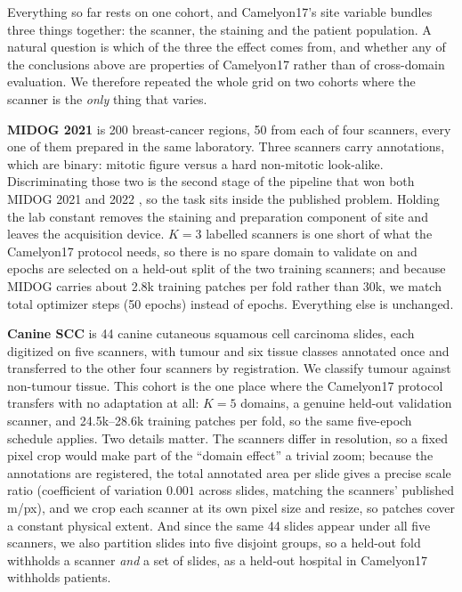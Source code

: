 \documentclass[10pt]{article} %
\begin{document}
Everything so far rests on one cohort, and Camelyon17's site variable bundles
three things together: the scanner, the staining and the patient population. A
natural question is which of the three the effect comes from, and whether any
of the conclusions above are properties of Camelyon17 rather than of
cross-domain evaluation. We therefore repeated the whole grid on two cohorts
where the scanner is the \emph{only} thing that varies.

\textbf{MIDOG 2021} \citep{aubreville2023midog} is 200 breast-cancer regions,
50 from each of four scanners, every one of them prepared in the same
laboratory. Three scanners carry annotations, which are binary: mitotic figure
versus a hard non-mitotic look-alike. Discriminating those two is the second
stage of the pipeline that won both MIDOG 2021 and 2022
\citep{jahanifar2024mitosis}, so the task sits inside the published problem.
Holding the lab constant removes the staining and preparation component of site
and leaves the acquisition device. $K=3$ labelled scanners is one short of
what the Camelyon17 protocol needs, so there is no spare domain to validate on
and epochs are selected on a held-out split of the two training scanners; and
because MIDOG carries about 2.8k training patches per fold rather than 30k, we
match total optimizer steps (50 epochs) instead of epochs. Everything else is
unchanged.

\textbf{Canine SCC} \citep{wilm2023canine} is 44 canine cutaneous squamous cell
carcinoma slides, each digitized on five scanners, with tumour and six tissue
classes annotated once and transferred to the other four scanners by
registration. We classify tumour against non-tumour tissue. This cohort is the
one place where the Camelyon17 protocol transfers with no adaptation at all:
$K=5$ domains, a genuine held-out validation scanner, and 24.5k--28.6k training
patches per fold, so the same five-epoch schedule applies. Two details matter.
The scanners differ in resolution, so a fixed pixel crop would make part of the
``domain effect'' a trivial zoom; because the annotations are registered, the
total annotated area per slide gives a precise scale ratio (coefficient of
variation $0.001$ across slides, matching the scanners' published
\textmu m/px), and we crop each scanner at its own pixel size and resize, so
patches cover a constant physical extent. And since the same 44 slides appear
under all five scanners, we also partition slides into five disjoint groups, so
a held-out fold withholds a scanner \emph{and} a set of slides, as a held-out
hospital in Camelyon17 withholds patients.
\end{document}
